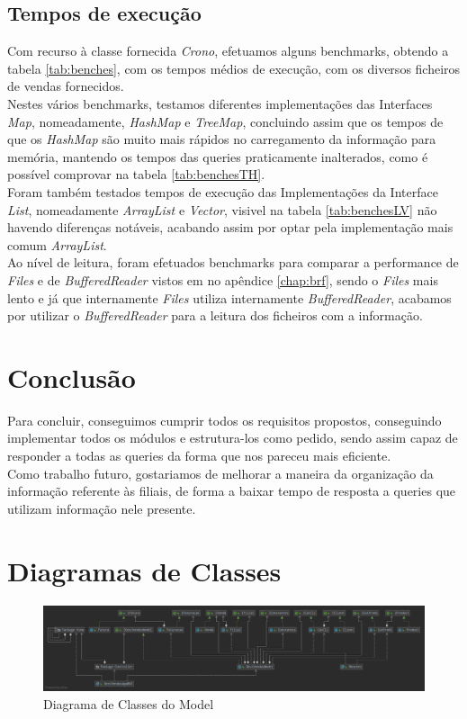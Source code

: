 \documentclass[a4paper]{report}
\begin{document}
\section{Tempos de execução}

Com recurso à classe fornecida \textit{Crono}, efetuamos alguns benchmarks, obtendo
a tabela \ref{tab:benches}, com os tempos médios de execução, com os diversos ficheiros
de vendas fornecidos.\\
Nestes vários benchmarks, testamos diferentes implementações das Interfaces \textit{Map},
nomeadamente, \textit{HashMap} e \textit{TreeMap}, concluindo assim que os tempos de 
que os \textit{HashMap} são muito mais rápidos no carregamento da informação para 
memória, mantendo os tempos das queries praticamente inalterados, como é possível
comprovar na tabela \ref{tab:benchesTH}.\\
Foram também testados tempos de execução das Implementações da Interface \textit{List},
nomeadamente \textit{ArrayList} e \textit{Vector}, visivel na tabela \ref{tab:benchesLV}
não havendo diferenças notáveis, acabando assim por optar pela implementação 
mais comum \textit{ArrayList}.\\
Ao nível de leitura, foram efetuados benchmarks para comparar a performance de
\textit{Files} e de \textit{BufferedReader} vistos em no apêndice \ref{chap:brf}, sendo o
\textit{Files} mais lento e já que internamente \textit{Files} utiliza internamente
\textit{BufferedReader}, acabamos por utilizar o \textit{BufferedReader} para a leitura
dos ficheiros com a informação.

\chapter{Conclusão}

Para concluir, conseguimos cumprir todos os requisitos propostos, conseguindo implementar
todos os módulos e estrutura-los como pedido, sendo assim capaz de responder a todas as 
queries da forma que nos pareceu mais eficiente.\\
Como trabalho futuro, gostariamos de melhorar a maneira da organização da informação 
referente às filiais, de forma a baixar tempo de resposta a queries que utilizam informação
nele presente.

\appendix

\chapter{Diagramas de Classes}
\begin{figure}[H]
    \begin{center}
        \includegraphics[width=1\textwidth]{modelGraph.png}\par
        \caption{Diagrama de Classes do Model}
    \end{center}
\end{figure}
\end{document}
